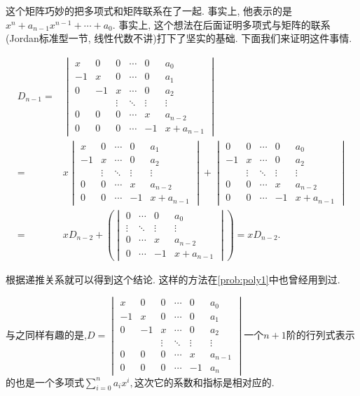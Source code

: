 \begin{sol*}
这个矩阵巧妙的把多项式和矩阵联系在了一起. 事实上, 他表示的是$x^{n}+a_{n-1}x^{n-1}+\cdots+a_{0}.$
事实上, 这个想法在后面证明多项式与矩阵的联系(Jordan标准型一节, 线性代数不讲)打下了坚实的基础. 下面我们来证明这件事情. 

\begin{align*}
D_{n-1}= & \begin{vmatrix}x & 0 & 0 & \cdots & 0 & a_{0}\\
-1 & x & 0 & \cdots & 0 & a_{1}\\
0 & -1 & x & \cdots & 0 & a_{2}\\
 &  & \vdots & \ddots & \vdots & \vdots\\
0 & 0 & 0 & \cdots & x & a_{n-2}\\
0 & 0 & 0 & \cdots & -1 & x+a_{n-1}
\end{vmatrix}\\
= & x\begin{vmatrix}x & 0 & \cdots & 0 & a_{1}\\
-1 & x & \cdots & 0 & a_{2}\\
 & \vdots & \ddots & \vdots & \vdots\\
0 & 0 & \cdots & x & a_{n-2}\\
0 & 0 & \cdots & -1 & x+a_{n-1}
\end{vmatrix}+\begin{vmatrix}0 & 0 & \cdots & 0 & a_{0}\\
-1 & x & \cdots & 0 & a_{2}\\
 & \vdots & \ddots & \vdots & \vdots\\
0 & 0 & \cdots & x & a_{n-2}\\
0 & 0 & \cdots & -1 & x+a_{n-1}
\end{vmatrix}\\
= & xD_{n-2}+\left(\begin{vmatrix}0 & \cdots & 0 & a_{0}\\
\vdots & \ddots & \vdots & \vdots\\
0 & \cdots & x & a_{n-2}\\
0 & \cdots & -1 & x+a_{n-1}
\end{vmatrix}\right)=xD_{n-2}.
\end{align*}

根据递推关系就可以得到这个结论. 这样的方法在\ref{prob:poly1}中也曾经用到过. 

与之同样有趣的是,$D=\begin{vmatrix}x & 0 & 0 & \cdots & 0 & a_{0}\\
-1 & x & 0 & \cdots & 0 & a_{1}\\
0 & -1 & x & \cdots & 0 & a_{2}\\
 &  & \vdots & \ddots & \vdots & \vdots\\
0 & 0 & 0 & \cdots & x & a_{n-1}\\
0 & 0 & 0 & \cdots & -1 & a_{n}
\end{vmatrix}$一个$n+1$阶的行列式表示的也是一个多项式$\sum_{i=0}^{n}a_{i}x^{i},$这次它的系数和指标是相对应的. 
\end{sol*}

